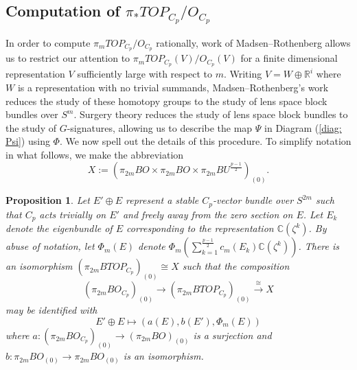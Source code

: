 \documentclass[11pt, twoside]{amsart}
\theoremstyle{plain}
\newtheorem{prop}[theorem]{Proposition}
\theoremstyle{definition}
\theoremstyle{remark}
\newcommand{\R}{\mathbb R}
\newcommand{\C}{\mathbb C}
\begin{document}
\subsection{Computation of $\pi_* TOP_{C_p}/ O_{C_p}$}

In order to compute $\pi_mTOP_{C_p}/O_{C_p}$ rationally, work of Madsen--Rothenberg allows us to restrict our attention to $\pi_mTOP_{C_p}(V)/O_{C_p}(V)$ for a finite dimensional representation $V$ sufficiently large with respect to $m$.
Writing $V=W\oplus\R^i$ where $W$ is a representation with no trivial summands, Madsen--Rothenberg's work reduces the study of these homotopy groups to the study of lens space block bundles over $S^m$.
Surgery theory reduces the study of lens space block bundles to the study of $G$-signatures, allowing us to describe the map $\Psi$ in Diagram (\ref{diag: Psi}) using $\Phi$.
We now spell out the details of this procedure.
To simplify notation in what follows, we make the abbreviation
\[
X:=(\pi_{2m}BO\times\pi_{2m}BO\times\pi_{2m}BU^{\frac{p-1}{2}})_{(0)}.
\]

\begin{prop}\label{prop: LES for p odd}
Let $E'\oplus E$ represent a stable $C_p$-vector bundle over $S^{2m}$ such that $C_p$ acts trivially on $E'$ and freely away from the zero section on $E$.
Let $E_k$ denote the eigenbundle of $E$ corresponding to the representation $\C(\zeta^k)$.
By abuse of notation, let $\Phi_m(E)$ denote $\Phi_m\left(\sum_{k=1}^{\frac{p-1}{2}}c_m(E_k)\C(\zeta^k)\right)$.
There is an isomorphism $(\pi_{2m} BTOP_{C_p})_{(0)}\cong X$ such that the composition
\[
(\pi_{2m}BO_{C_p})_{(0)}\to(\pi_{2m}BTOP_{C_p})_{(0)}\xrightarrow{\cong} X
\]
may be identified with
\[
E'\oplus E\mapsto(a(E),b(E'),\Phi_m(E))
\]
where $a:(\pi_{2m}BO_{C_p})_{(0)}\to(\pi_{2m}BO)_{(0)}$ is a surjection and $b:\pi_{2m}BO_{(0)}\to\pi_{2m}BO_{(0)}$ is an isomorphism.
\end{prop}
\end{document}
